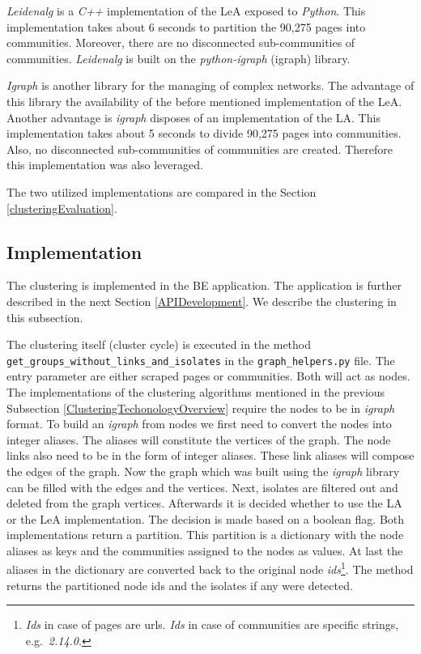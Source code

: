 \textit{Leidenalg} is a \textit{C++} implementation of the LeA exposed to \textit{Python}. This implementation takes about 6 seconds to partition the 90,275 pages into communities. Moreover, there are no disconnected sub-communities of communities. \textit{Leidenalg} is built on the \textit{python-igraph} (igraph) library. 

\textit{Igraph} is another library for the managing of complex networks. The advantage of this library the availability of the before mentioned implementation of the LeA. Another advantage is \textit{igraph} disposes of an implementation of the LA. This implementation takes about 5 seconds to divide 90,275 pages into communities. Also, no disconnected sub-communities of communities are created. Therefore this implementation was also leveraged.

The two utilized implementations are compared in the Section \ref{clusteringEvaluation}.

\subsection{Implementation} \label{ClusteringImplementation}
The clustering is implemented in the BE application. The application is further described in the next Section \ref{APIDevelopment}. We describe the clustering in this subsection. 

The clustering itself (cluster cycle) is executed in the method \\ \texttt{get\_groups\_without\_links\_and\_isolates} in the \texttt{graph\_helpers.py} file. The entry parameter are either scraped pages or communities. Both will act as nodes. The implementations of the clustering algorithms mentioned in the previous Subsection \ref{ClusteringTechonologyOverview} require the nodes to be in \textit{igraph} format. To build an \textit{igraph} from nodes we first need to convert the nodes into integer aliases. The aliases will constitute the vertices of the graph. The node links also need to be in the form of integer aliases. These link aliases will compose the edges of the graph. Now the graph which was built using the \textit{igraph} library can be filled with the edges and the vertices. Next, isolates are filtered out and deleted from the graph vertices. Afterwards it is decided whether to use the LA or the LeA implementation. The decision is made based on a boolean flag. Both implementations return a partition. This partition is a dictionary with the node aliases as keys and the communities assigned to the nodes as values. At last the aliases in the dictionary are converted back to the original node \textit{ids}\footnote{\textit{Ids} in case of pages are urls. \textit{Ids} in case of communities are specific strings, e.g.~\textit{2.14.0}.}. The method returns the partitioned node ids and the isolates if any were detected. 


